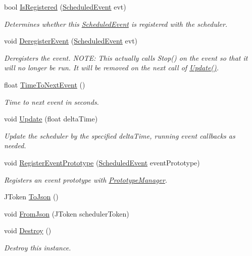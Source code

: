 \begin{DoxyCompactItemize}
bool \hyperlink{class_scheduler_1_1_scheduler_a53ebcf4526da0f018a1012cd79f82ff4}{Is\+Registered} (\hyperlink{class_scheduler_1_1_scheduled_event}{Scheduled\+Event} evt)
\begin{DoxyCompactList}\small\item\em Determines whether this \hyperlink{class_scheduler_1_1_scheduled_event}{Scheduled\+Event} is registered with the scheduler. \end{DoxyCompactList}\item 
void \hyperlink{class_scheduler_1_1_scheduler_a7b069af9525b1f363465d99e916155ae}{Deregister\+Event} (\hyperlink{class_scheduler_1_1_scheduled_event}{Scheduled\+Event} evt)
\begin{DoxyCompactList}\small\item\em Deregisters the event. N\+O\+TE\+: This actually calls Stop() on the event so that it will no longer be run. It will be removed on the next call of \hyperlink{class_scheduler_1_1_scheduler_a9762a6e51fd4a109c4a89b718a5a8ce3}{Update()}. \end{DoxyCompactList}\item 
float \hyperlink{class_scheduler_1_1_scheduler_ac22fd3be39b7d3fd210c5e64417c6d2c}{Time\+To\+Next\+Event} ()
\begin{DoxyCompactList}\small\item\em Time to next event in seconds. \end{DoxyCompactList}\item 
void \hyperlink{class_scheduler_1_1_scheduler_a9762a6e51fd4a109c4a89b718a5a8ce3}{Update} (float delta\+Time)
\begin{DoxyCompactList}\small\item\em Update the scheduler by the specified delta\+Time, running event callbacks as needed. \end{DoxyCompactList}\item 
void \hyperlink{class_scheduler_1_1_scheduler_aed037bf3f01540e9f8fcf7c4a0f61573}{Register\+Event\+Prototype} (\hyperlink{class_scheduler_1_1_scheduled_event}{Scheduled\+Event} event\+Prototype)
\begin{DoxyCompactList}\small\item\em Registers an event prototype with \hyperlink{class_prototype_manager}{Prototype\+Manager}. \end{DoxyCompactList}\item 
J\+Token \hyperlink{class_scheduler_1_1_scheduler_ad84c5bec9c251c9c3859fd6253bad97b}{To\+Json} ()
\item 
void \hyperlink{class_scheduler_1_1_scheduler_a45a216c36b720e5f1bae0796aeae0f36}{From\+Json} (J\+Token scheduler\+Token)
\item 
void \hyperlink{class_scheduler_1_1_scheduler_a2d598dd02e278c0fb25d473ae622229f}{Destroy} ()
\begin{DoxyCompactList}\small\item\em Destroy this instance. \end{DoxyCompactList}\end{DoxyCompactItemize}
